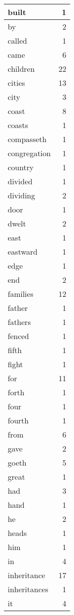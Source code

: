 \begin{center}
\begin{longtable}{l|r}
built & 1\\ \hline 
by & 2\\ \hline 
called & 1\\ \hline 
came & 6\\ \hline 
children & 22\\ \hline 
cities & 13\\ \hline 
city & 3\\ \hline 
coast & 8\\ \hline 
coasts & 1\\ \hline 
compasseth & 1\\ \hline 
congregation & 1\\ \hline 
country & 1\\ \hline 
divided & 1\\ \hline 
dividing & 2\\ \hline 
door & 1\\ \hline 
dwelt & 2\\ \hline 
east & 1\\ \hline 
eastward & 1\\ \hline 
edge & 1\\ \hline 
end & 2\\ \hline 
families & 12\\ \hline 
father & 1\\ \hline 
fathers & 1\\ \hline 
fenced & 1\\ \hline 
fifth & 1\\ \hline 
fight & 1\\ \hline 
for & 11\\ \hline 
forth & 1\\ \hline 
four & 1\\ \hline 
fourth & 1\\ \hline 
from & 6\\ \hline 
gave & 2\\ \hline 
goeth & 5\\ \hline 
great & 1\\ \hline 
had & 3\\ \hline 
hand & 1\\ \hline 
he & 2\\ \hline 
heads & 1\\ \hline 
him & 1\\ \hline 
in & 4\\ \hline 
inheritance & 17\\ \hline 
inheritances & 1\\ \hline 
it & 4\\ \hline 

\end{longtable}
\end{center}
